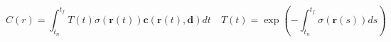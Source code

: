 \begin{equation}
    C(r) = \int_{t_n}^{t_f}T(t)\sigma(\pmb{r}(t))\pmb{c}(\pmb{r}(t), \pmb{d})dt \quad T(t) = \exp{(-\int_{t_n}^{t_f}\sigma(\pmb{r}(s))ds)}
    \label{eq:volume-rendering}
\end{equation}